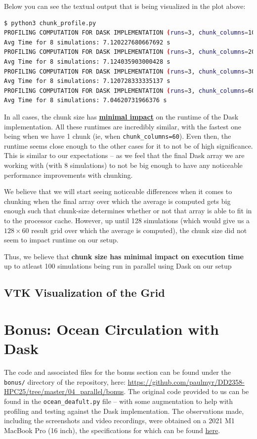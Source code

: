 \documentclass[a4paper,12pt]{article}
\begin{document}
Below you can see the textual output that is being visualized in the plot above:
\begin{lstlisting}[language=bash,basicstyle=\tiny\ttfamily]
$ python3 chunk_profile.py
PROFILING COMPUTATION FOR DASK IMPLEMENTATION (runs=3, chunk_columns=10)
Avg Time for 8 simulations: 7.120227680667692 s 
PROFILING COMPUTATION FOR DASK IMPLEMENTATION (runs=3, chunk_columns=20)
Avg Time for 8 simulations: 7.124035903000428 s 
PROFILING COMPUTATION FOR DASK IMPLEMENTATION (runs=3, chunk_columns=30)
Avg Time for 8 simulations: 7.120728333335137 s 
PROFILING COMPUTATION FOR DASK IMPLEMENTATION (runs=3, chunk_columns=60)
Avg Time for 8 simulations: 7.04620731966376 s
\end{lstlisting}

In all cases, the chunk size has \textbf{\underline{minimal impact}} on the runtime of the Dask implementation. All these runtimes are incredibly similar, with the fastest one being when we have 1 chunk (ie, when \verb|chunk_columns=60|). Even then, the runtime seems close enough to the other cases for it to not be of high significance. This is similar to our expectations -- as we feel that the final Dask array we are working with (with 8 simulations) to not be big enough to have any noticeable performance improvements with chunking. 

We believe that we will start seeing noticeable differences when it comes to chunking when the final array over which the average is computed gets big enough such that chunk-size determines whether or not that array is able to fit in to the processor cache. However, up until 128 simulations (which would give us a $128 \times 60$ result grid over which the average is computed), the chunk size did not seem to impact runtime on our setup. 

Thus, we believe that \textbf{chunk size has minimal impact on execution time} up to atleast 100 simulations being run in parallel using Dask on our setup

\subsection{VTK Visualization of the Grid}

\section{Bonus: Ocean Circulation with Dask}
The code and associated files for the bonus section can be found under the \verb|bonus/| directory of the repository, here: \url{https://github.com/paulmyr/DD2358-HPC25/tree/master/04_parallel/bonus}. The original code provided to us can be found in the \verb|ocean_deafult.py| file -- with some augmentation to help with profiling and testing against the Dask implementation. The observations made, including the screenshots and video recordings, were obtained on a 2021 M1 MacBook Pro (16 inch), the specifications for which can be found \href{https://support.apple.com/en-us/111901}{here}.
\end{document}
